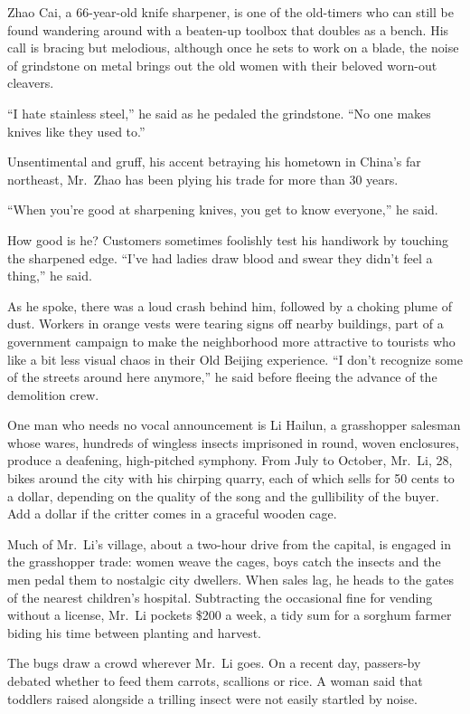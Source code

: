 ﻿\documentclass[12pt]{article}
\begin{document}
Zhao Cai, a 66-year-old knife sharpener, is one of the old-timers who can still be found wandering
around with a beaten-up toolbox that doubles as a bench. His call is bracing but melodious, although
once he sets to work on a blade, the noise of grindstone on metal brings out the old women with
their beloved worn-out cleavers.

``I hate stainless steel,'' he said as he pedaled the grindstone. ``No one makes knives like they
used to.''

Unsentimental and gruff, his accent betraying his hometown in China's far northeast, Mr.~Zhao has
been plying his trade for more than 30 years.

``When you're good at sharpening knives, you get to know everyone,'' he said.

How good is he? Customers sometimes foolishly test his handiwork by touching the sharpened edge.
``I've had ladies draw blood and swear they didn't feel a thing,'' he said.

As he spoke, there was a loud crash behind him, followed by a choking plume of dust. Workers in
orange vests were tearing signs off nearby buildings, part of a government campaign to make the
neighborhood more attractive to tourists who like a bit less visual chaos in their Old Beijing
experience. ``I don't recognize some of the streets around here anymore,'' he said before fleeing
the advance of the demolition crew.

One man who needs no vocal announcement is Li Hailun, a grasshopper salesman whose wares, hundreds
of wingless insects imprisoned in round, woven enclosures, produce a deafening, high-pitched
symphony. From July to October, Mr.~Li, 28, bikes around the city with his chirping quarry, each of
which sells for 50 cents to a dollar, depending on the quality of the song and the gullibility of
the buyer. Add a dollar if the critter comes in a graceful wooden cage.

Much of Mr.~Li's village, about a two-hour drive from the capital, is engaged in the grasshopper
trade: women weave the cages, boys catch the insects and the men pedal them to nostalgic city
dwellers. When sales lag, he heads to the gates of the nearest children's hospital. Subtracting the
occasional fine for vending without a license, Mr.~Li pockets \$200 a week, a tidy sum for a sorghum
farmer biding his time between planting and harvest.

The bugs draw a crowd wherever Mr.~Li goes. On a recent day, passers-by debated whether to feed them
carrots, scallions or rice. A woman said that toddlers raised alongside a trilling insect were not
easily startled by noise.
\end{document}
